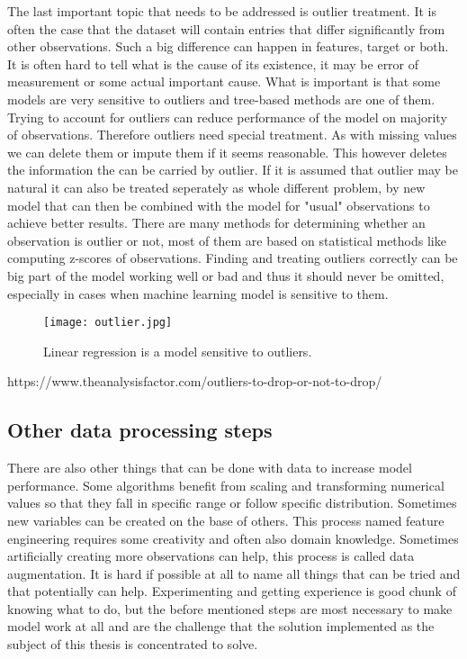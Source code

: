 \documentclass[a4paper,twoside,12pt]{book}
\begin{document}
The last important topic that needs to be addressed is outlier treatment. It is often the case that the dataset will contain entries that differ significantly from other observations. Such a big difference can happen in features, target or both. It is often hard to tell what is the cause of its existence, it may be error of measurement or some actual important cause. What is important is that some models are very sensitive to outliers and tree-based methods are one of them. Trying to account for outliers can reduce performance of the model on majority of observations. Therefore outliers need special treatment.
As with missing values we can delete them or impute them if it seems reasonable. This however deletes the information the can be carried by outlier. If it is assumed that outlier may be natural it can also be treated seperately as whole different problem, by new model that can then be combined with the model for "usual" observations to achieve better results.
There are many methods for determining whether an observation is outlier or not, most of them are based on statistical methods like computing z-scores of observations. 
Finding and treating outliers correctly can be big part of the model working well or bad and thus it should never be omitted, especially in cases when machine learning model is sensitive to them.

\begin{figure}[h]
    \centering
    \texttt{[image: outlier.jpg]}
    \caption{Linear regression is a model sensitive to outliers.}
    \label{fig:mesh1}
\end{figure}


https://www.theanalysisfactor.com/outliers-to-drop-or-not-to-drop/


\subsection{Other data processing steps}

There are also other things that can be done with data to increase model performance. Some algorithms benefit from scaling and transforming numerical values so that they fall in specific range or follow specific distribution. Sometimes new variables can be created on the base of others. This process named feature engineering requires some creativity and often also domain knowledge. Sometimes artificially creating more observations can help, this process is called data augmentation. It is hard if possible at all to name all things that can be tried and that potentially can help. Experimenting and getting experience is good chunk of knowing what to do, but the before mentioned steps are most necessary to make model work at all and are the challenge that the solution implemented as the subject of this thesis is concentrated to solve.
\end{document}
